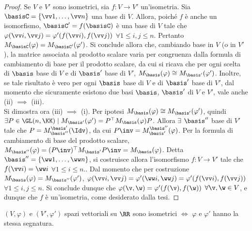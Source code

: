 \begin{proof} Se $V$ e $V'$ sono isometrici, sia $f : V \to V'$ un'isometria. Sia $\basisC = \{ \vv 1, \ldots, \vv n \}$ una base di $V$. Allora, poiché $f$ è anche un isomorfismo, $\basisC' = f(\basisC)$ è una base di $V$ tale che
	$\varphi(\vv i, \vv j) = \varphi'(f(\vv i), f(\vv j))$ $\forall 1 \leq i, j \leq n$. Pertanto $M_\basisC(\varphi) = M_{\basisC'}(\varphi')$. Si conclude allora che, cambiando base in $V$ (o in $V'$), la matrice associata
	al prodotto scalare varia per congruenza dalla formula di cambiamento di base per il prodotto scalare, da cui si ricava che per ogni scelta di $\basis$ base di $V$ e di $\basis'$ base di $V'$, $M_\basis(\varphi) \cong M_{\basis'}(\varphi')$. Inoltre, se tale risultato è vero per ogni $\basis$ base di $V$ e di $\basis'$ base di $V'$, dal momento che sicuramente esistono due basi $\basis$, $\basis'$ di $V$ e $V'$, vale anche (ii) $\implies$ (iii). \\
	
	Si dimostra ora (iii) $\implies$ (i). Per ipotesi $M_\basis(\varphi) \cong M_{\basis'}(\varphi')$, quindi
	$\exists P \in \GL(n, \KK) \mid M_{\basis'}(\varphi') = P^\top M_\basis(\varphi) P$. Allora $\exists$ $\basis''$
	base di $V'$ tale che $P = M_{\basis''}^{\basis'}(\Idv)$, da cui $P\inv = M_{\basis'}^{\basis''}(\varphi)$. Per la formula di cambiamento di base del prodotto
	scalare, $M_{\basis''}(\varphi) = (P\inv)^\top M_{\basis'} P\inv = M_\basis(\varphi)$. Detta
	$\basis'' = \{ \ww 1, \ldots, \ww n \}$, si costruisce allora l'isomorfismo $f : V \to V'$ tale
	che $f(\vv i) = \ww i$ $\forall 1 \leq i \leq n$.. Dal momento che per costruzione $M_\basis(\varphi) = M_{\basis''}(\varphi')$,
	$\varphi(\vv i, \vv j) = \varphi'(\ww i, \ww j) = \varphi'(f(\vv i), f(\vv j))$ $\forall 1 \leq i, j \leq n$.
	Si conclude dunque che $\varphi(\v, \w) = \varphi'(f(\v), f(\w))$ $\forall \v, \w \in V$, e dunque
	che $f$ è un'isometria, come desiderato dalla tesi. 
\end{proof}

\begin{proposition} $(V, \varphi)$ e $(V', \varphi')$ spazi vettoriali
	su $\RR$ sono
	isometrici $\iff$ $\varphi$ e $\varphi'$ hanno la stessa segnatura.
\end{proposition}

